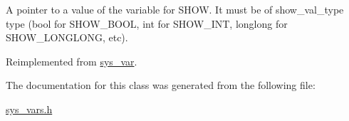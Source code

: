 A pointer to a value of the variable for S\+H\+OW. It must be of show\+\_\+val\+\_\+type type (bool for S\+H\+O\+W\+\_\+\+B\+O\+OL, int for S\+H\+O\+W\+\_\+\+I\+NT, longlong for S\+H\+O\+W\+\_\+\+L\+O\+N\+G\+L\+O\+NG, etc). 

Reimplemented from \mbox{\hyperlink{classsys__var_a3e511591aaf555d2bc2ce40a80b7e899}{sys\+\_\+var}}.



The documentation for this class was generated from the following file\+:\begin{DoxyCompactItemize}
\item 
\mbox{\hyperlink{sys__vars_8h}{sys\+\_\+vars.\+h}}\end{DoxyCompactItemize}
